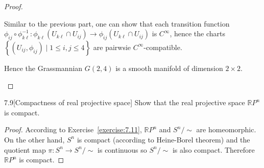 \begin{proof}
\begin{enumerate}[label={(\alph*)},leftmargin=*]
              Similar to the previous part, one can show that each transition function \( \phi_{ij} \circ \phi_{k\ell}^{-1}: \phi_{k\ell}(U_{k\ell} \cap U_{ij}) \to \phi_{ij}(U_{k\ell}\cap U_{ij}) \) is \( C^{\infty} \), hence the charts \( \left\{ (U_{ij}, \phi_{ij}) \mid 1\leq i, j\leq 4 \right\} \) are pairwsie \( C^{\infty} \)-compatible.

              Hence the Grassmannian \( G(2, 4) \) is a smooth manifold of dimension \( 2\times 2 \).
    \end{enumerate}
\end{proof}

\begin{problem}{7.9}[Compactness of real projective space]
Show that the real projective space \( \mathbb{R}P^{n} \) is compact.
\end{problem}

\begin{proof}
    According to Exercise~\ref{exercise:7.11}, \( \mathbb{R}P^{n} \) and \( S^{n}/\!\sim \) are homeomorphic. On the other hand, \( S^{n} \) is compact (according to Heine-Borel theorem) and the quotient map \( \pi: S^{n} \to S^{n}/\!\sim \) is continuous so \( S^{n}/\!\sim \) is also compact. Therefore \( \mathbb{R}P^{n} \) is compact.
\end{proof}
